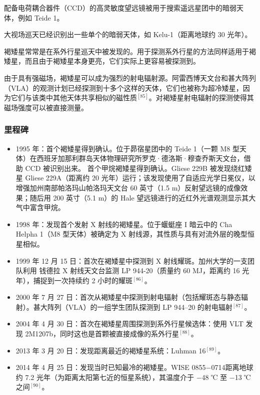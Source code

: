 配备电荷耦合器件（CCD）的高灵敏度望远镜被用于搜索遥远星团中的暗弱天体，例如 Teide 1。

大视场巡天已经识别出一些单个的暗弱天体，如 Kelu-1（距离地球约 30 光年）。

褐矮星常常是在系外行星巡天中被发现的。用于探测系外行星的方法同样适用于褐矮星，而且由于褐矮星本身更亮，它们实际上更容易被探测到。

由于具有强磁场，褐矮星可以成为强烈的射电辐射源。阿雷西博天文台和甚大阵列（VLA）的观测计划已经探测到十多个这样的天体，它们也被称为超冷矮星，因为它们与该类中其他天体共享相似的磁性质$^{[85]}$。对褐矮星射电辐射的探测使得其磁场强度可以被直接测量。
\subsubsection{里程碑}
\begin{itemize}
\item 1995 年：首个褐矮星得到确认。位于昴宿星团中的 Teide 1（一颗 M8 型天体）在西班牙加那利群岛天体物理研究所罗克·德洛斯·穆查乔斯天文台，借助 CCD 被识别出来。
首个甲烷褐矮星得到确认。Gliese 229B 被发现绕红矮星 Gliese 229A（距离约 20 光年）运行；该发现使用了自适应光学日冕仪，以增强加州南部帕洛玛山帕洛玛天文台 60 英寸（1.5 m）反射望远镜的成像效果；随后用 200 英寸（5.1 m）的 Hale 望远镜进行的近红外光谱观测显示其大气中富含甲烷。
\item 1998 年：发现首个发射 X 射线的褐矮星。位于蝘蜓座 I 暗云中的 Cha Helpha 1（M8 型天体）被确定为 X 射线源，其性质与具有对流外层的晚型恒星相似。
\item 1999 年 12 月 15 日：首次在褐矮星中探测到 X 射线耀斑。加州大学的一支团队利用 钱德拉 X 射线天文台监测 LP 944-20（质量约 60 MJ，距离约 16 光年），捕捉到一次持续约 2 小时的耀斑$^{[86]}$。
\item 2000 年 7 月 27 日：首次从褐矮星中探测到射电辐射（包括耀斑态与静态辐射）。甚大阵列（VLA）的一组学生团队探测到 LP 944–20 的射电辐射$^{[87]}$。
\item 2004 年 4 月 30 日：首次在褐矮星周围探测到系外行星候选体：使用 VLT 发现 2M1207b，同时这也是首颗被直接成像的系外行星$^{[88]}$。
\item 2013 年 3 月 20 日：发现距离最近的褐矮星系统：Luhman 16$^{[89]}$。
\item 2014 年 4 月 25 日：发现当时已知最冷的褐矮星。WISE 0855−0714距离地球约 7.2 光年（为距离太阳第七近的恒星系统），其温度介于 −48 ℃ 至 −13 ℃ 之间$^{[90]}$。
\end{itemize}

